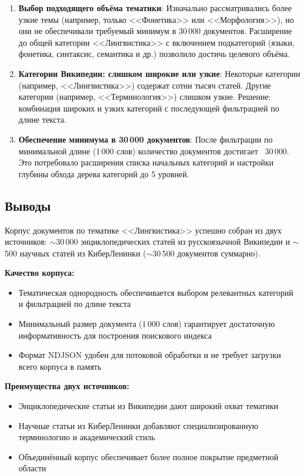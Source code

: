 \begin{enumerate}
    \item \textbf{Выбор подходящего объёма тематики}: Изначально рассматривались более узкие темы (например, только <<Фонетика>> или <<Морфология>>), но они не обеспечивали требуемый минимум в 30\,000 документов. Расширение до общей категории <<Лингвистика>> с включением подкатегорий (языки, фонетика, синтаксис, семантика и др.) позволило достичь целевого объёма.
    
    \item \textbf{Категории Википедии: слишком широкие или узкие}: Некоторые категории (например, <<Лингвистика>>) содержат сотни тысяч статей. Другие категории (например, <<Терминология>>) слишком узкие. Решение: комбинация широких и узких категорий с последующей фильтрацией по длине текста.
    
    \item \textbf{Обеспечение минимума в 30\,000 документов}: После фильтрации по минимальной длине (1\,000 слов) количество документов достигает ~30\,000. Это потребовало расширения списка начальных категорий и настройки глубины обхода дерева категорий до 5 уровней.
\end{enumerate}

\subsection{Выводы}

Корпус документов по тематике <<Лингвистика>> успешно собран из двух источников: $\sim$30\,000 энциклопедических статей из русскоязычной Википедии и $\sim$500 научных статей из КиберЛенинки ($\sim$30\,500 документов суммарно).

\textbf{Качество корпуса:}
\begin{itemize}
    \item Тематическая однородность обеспечивается выбором релевантных категорий и фильтрацией по длине текста
    \item Минимальный размер документа (1\,000 слов) гарантирует достаточную информативность для построения поискового индекса
    \item Формат NDJSON удобен для потоковой обработки и не требует загрузки всего корпуса в память
\end{itemize}

\textbf{Преимущества двух источников:}
\begin{itemize}
    \item Энциклопедические статьи из Википедии дают широкий охват тематики
    \item Научные статьи из КиберЛенинки добавляют специализированную терминологию и академический стиль
    \item Объединённый корпус обеспечивает более полное покрытие предметной области
\end{itemize}

